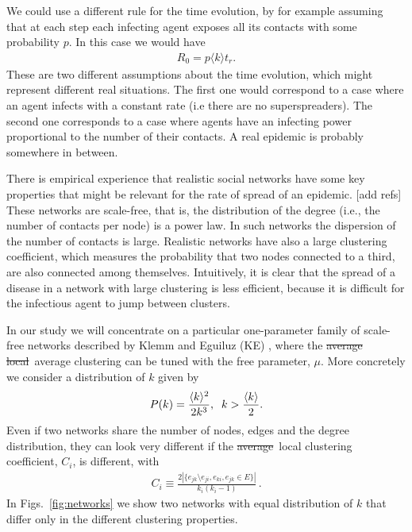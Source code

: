 \documentclass[a4paper,oneside,11pt]{article}
\newcommand{\mycomment}[1]{\textcolor[rgb]{0.75,0,0}{[#1]}}
\newcommand{\myreplacement}[2]{\textcolor[rgb]{0.75,0,0.75}{\sout{#1}~#2}}
\begin{document}
 We could use a different rule for the time evolution, by for example assuming that at each step each infecting agent exposes all its contacts with some probability $p$. In this case we would have
 \begin{eqnarray}
 R_0= p \langle k\rangle t_r. 
 \label{eq:r0jj}
 \end{eqnarray}
These are two different assumptions about the time evolution, which might represent different real situations. The first one would correspond to a case where an agent infects with a constant rate (i.e there are no superspreaders). The second one corresponds to a case where agents have an infecting power proportional to the number of their contacts. A real epidemic is probably somewhere in between.

 There is empirical experience that realistic social networks have some key properties that might be relevant for the rate of spread of an epidemic. \mycomment{add refs}  These networks are scale-free, that is, the distribution of the degree (i.e., the number of contacts per node) is a power law. 
   In such networks the dispersion of the number of contacts is large. Realistic networks have also a large clustering coefficient, which measures the probability that two nodes connected to a third, are also connected among themselves. Intuitively, it is clear that the spread of a disease in a network with large clustering is less efficient, because it is difficult for the infectious agent to jump between clusters.

In our study we will concentrate on a particular one-parameter family of scale-free networks described by Klemm and Eguiluz (KE)
\cite{Klemm_2002}, where the \myreplacement{average local}{average} clustering can be tuned with the free parameter, \(\mu\). More concretely we consider a distribution of $k$ given by
 \begin{eqnarray}
  P(k) = {\langle k \rangle^2 \over 2 k^3},\;\;  k > {\langle k\rangle\over 2}.
  \end{eqnarray}
 Even if two networks share the number of nodes, edges and the degree distribution, they can look very different if the \myreplacement{average}{local} clustering coefficient, $C_i$, is different, with
\begin{eqnarray}
C_i \equiv \frac{2|\{e_{jk}\setminus e_{ji},e_{ki},e_{jk}\in E\}|}{k_i(k_i-1)}\,.
\end{eqnarray}
In Figs.~\ref{fig:networks} we show two networks with equal distribution of $k$ that differ only in the  different clustering properties.
\end{document}
